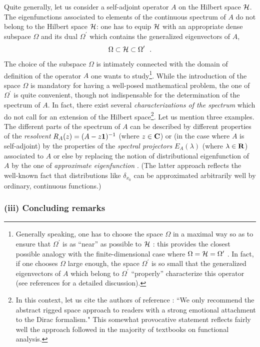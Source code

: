 \documentclass[12pt]{report}
\begin{document}
Quite generally, let us consider a self-adjoint operator 
$A$ on the Hilbert space ${\cal H}$. The eigenfunctions 
associated to elements of the continuous spectrum of $A$
do not belong to the Hilbert space ${\cal H}$: one has to equip 
${\cal H}$ with an appropriate dense subspace $\Omega$ and its dual 
$\Omega^{\prime}$ which contains the generalized eigenvectors
of $A$, 
\[
\Omega \subset {\cal H} \subset \Omega^{\prime}
\ \ .
\]
The choice of the subspace $\Omega$ is intimately connected 
 with the domain of definition of the operator $A$
one wants to study\footnote{Generally speaking, one has to choose
the space $\Omega$ in a maximal way so as  
to ensure that $\Omega^{\prime}$ is as ``near'' as possible
to ${\cal H}$ : this provides the closest possible 
analogy with the finite-dimensional case where 
$\Omega = {\cal H} = \Omega^{\prime}$
\cite{bere,ber}. In fact, if one chooses $\Omega$ large enough,
the space $\Omega^{\prime}$ is so small that 
the generalized eigenvectors of $A$ which belong to 
$\Omega^{\prime}$ 
``properly'' characterize 
this operator (see references \cite{ber,bere} for
a detailed discussion).}. 
While the introduction of the space  $\Omega$
is mandatory for having a well-posed mathematical problem, 
the one of $\Omega^{\prime}$ is quite convenient, though not 
indispensable for the determination of the spectrum of $A$.
In fact, there exist several {\em characterizations of the spectrum} 
which do not call for an extension of the Hilbert space\footnote{In 
this context, let us cite the authors of reference \cite{rs}: 
``We only recommend the abstract
rigged space approach to readers with a strong emotional attachment
to the Dirac formalism." This somewhat provocative statement 
reflects fairly well the approach followed in the majority of
textbooks on functional analysis.}.
Let us mention three examples.
The different parts of the spectrum of $A$
can be described by different properties of the {\em resolvent}
$R_A (z) = (A - z {\bf 1})^{-1}$
(where $z \in {\bf C}$) \cite{sg,bgc} or  (in the case where $A$
is self-adjoint) by the properties of the {\em spectral projectors}
$E_A (\lambda)$ (where $\lambda \in {\bf R}$)
associated to $A$
\cite{jvn, sg, rs} 
or else by replacing the notion of distributional eigenfunction 
of $A$ by the one of {\em approximate eigenfunction}
\cite{bgc}. (The latter approach reflects the well-known fact that 
distributions like $\delta_{x_0}$ can be approximated arbitrarily well 
by ordinary, continuous functions.)

\subsubsection{(iii) Concluding remarks} 
\end{document}
